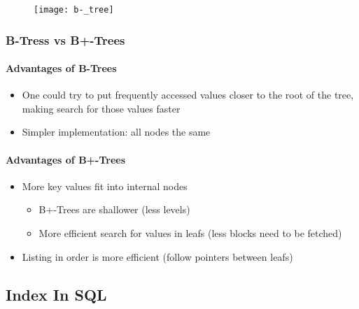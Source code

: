 \begin{figure}[H]
    \centering
    \texttt{[image: b-\_tree]}
\end{figure}

\subsubsection{B-Tress vs B+-Trees}

\begin{minipage}[t]{0.48\textwidth}
\paragraph{Advantages of B-Trees}
\begin{itemize}
    \item One could try to put frequently accessed values closer to the root of the tree, making search for those values faster
    \item Simpler implementation: all nodes the same
\end{itemize}
\end{minipage}
\hfill
\begin{minipage}[t]{0.48\textwidth}
\paragraph{Advantages of B+-Trees}
\begin{itemize}
    \item More key values fit into internal nodes
    \begin{itemize}
        \item B+-Trees are shallower (less levels)
        \item More efficient search for values in leafs (less blocks need to be fetched)
    \end{itemize}
    \item Listing in order is more efficient (follow pointers between leafs)
\end{itemize}
\end{minipage}

\subsection{Index In SQL}

